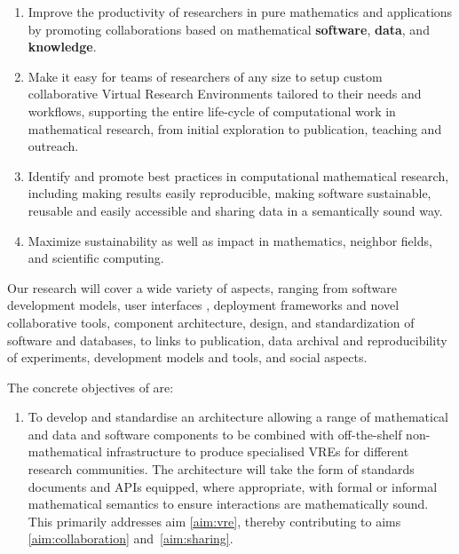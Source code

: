\documentclass[noworkareas,deliverables,gitinfo,compactht]{euproposal}
\begin{document}
\begin{proposal}
\begin{enumerate}
\item \label{aim:collaboration} Improve the productivity of
  researchers in pure mathematics and applications by promoting
  collaborations based on mathematical \textbf{software},
  \textbf{data}, and \textbf{knowledge}.
\item \label{aim:vre} Make it easy for teams of
  researchers of any size to setup custom collaborative Virtual Research
  Environments tailored to their needs and workflows, supporting the
  entire life-cycle of computational work in mathematical research,
  from initial exploration to publication, teaching and outreach.
\item \label{aim:sharing} Identify and promote best practices in
  computational mathematical research, including making results easily
  reproducible, making software sustainable, reusable and easily
  accessible and sharing data in a semantically sound way.
\item \label{aim:impact} Maximize sustainability as well as impact in
  mathematics, neighbor fields, and scientific computing.
\end{enumerate}



Our research will cover a wide variety of aspects, ranging from
software development models, user interfaces , deployment frameworks and novel collaborative tools,
component architecture, design, and standardization of software
 and databases, to links to publication, data archival
and reproducibility of experiments, development models and tools, and
social aspects.


The concrete objectives of \TheProject are:
\begin{enumerate}
\item\label{objective:framework} To develop and standardise
  an architecture allowing a range of mathematical and
  data and software components to be combined 
  with off-the-shelf non-mathematical infrastructure to produce
  specialised VREs for different research communities. The
  architecture will take the form of standards documents and APIs
  equipped, where appropriate, with formal or informal mathematical
  semantics to ensure interactions are mathematically sound. This primarily
  addresses aim \ref{aim:vre}, thereby contributing to aims
  \ref{aim:collaboration} and~\ref{aim:sharing}. 


\end{enumerate}
\end{proposal}
\end{document}
